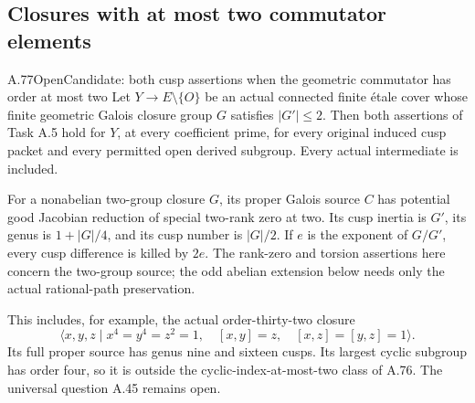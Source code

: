 \subsection{Closures with at most two commutator elements}

\begin{statement}{A.77}{Open}{Candidate: both cusp assertions when the geometric commutator has order at most two}
Let \(Y\to E\setminus\{O\}\) be an actual connected finite
\'{e}tale cover whose finite geometric Galois closure group
\(G\) satisfies \(|G'|\le2\). Then both assertions of
Task A.5 hold for \(Y\), at every coefficient prime,
for every original induced cusp packet and every permitted
open derived subgroup. Every actual intermediate is included.

For a nonabelian two-group closure \(G\), its proper
Galois source \(C\) has potential good Jacobian reduction
of special two-rank zero at two. Its cusp inertia is
\(G'\), its genus is \(1+|G|/4\), and its cusp
number is \(|G|/2\). If \(e\) is the exponent of
\(G/G'\), every cusp difference is killed by \(2e\).
The rank-zero and torsion assertions here concern the
two-group source; the odd abelian extension below needs
only the actual rational-path preservation.

This includes, for example, the actual order-thirty-two
closure
\[
 \langle x,y,z\mid x^4=y^4=z^2=1,\quad
             [x,y]=z,\quad [x,z]=[y,z]=1\rangle.       \tag{A.77.1}
\]
Its full proper source has genus nine and sixteen cusps.
Its largest cyclic subgroup has order four, so it is
outside the cyclic-index-at-most-two class of A.76.
The universal question A.45 remains open.
\end{statement}


